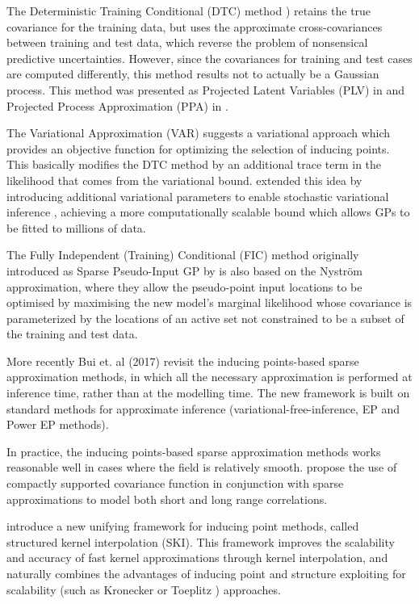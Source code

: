 \documentclass[]{interact}
\theoremstyle{plain}%
\theoremstyle{definition}
\theoremstyle{remark}
\begin{document}
The Deterministic Training Conditional (DTC) method \citep{ro2001sparse,seeger2003fast}) retains the true covariance for the training data, but uses the approximate cross-covariances between training and test data, which reverse the problem of nonsensical predictive uncertainties. However, since the covariances for training and test cases are computed differently, this method results not to actually be a Gaussian process. This method was presented as Projected Latent Variables (PLV) in \cite{seeger2003fast} and Projected Process Approximation (PPA) in \cite{rasmussen2006gaussian}. 

The Variational Approximation (VAR) \citep{titsias2009variational} suggests a variational approach which provides an objective function for optimizing the selection of inducing points. This basically modifies the DTC method by an additional trace term in the likelihood that comes from the variational bound.  \cite{hensman2013gaussian} extended this idea by introducing additional variational parameters to enable stochastic variational inference \citep{hoffman2013stochastic}, achieving a more computationally scalable bound which allows GPs to be fitted to millions of data.

The Fully Independent (Training) Conditional (FIC) \citep{quinonero2005unifying} method originally introduced as Sparse Pseudo-Input GP by \cite{snelson2006sparse} is also based on the Nystr\"om approximation, where they allow the pseudo-point input locations to be optimised by maximising the new model's marginal likelihood whose covariance is parameterized by the locations of an active set not constrained to be a subset of the training and test data.

More recently Bui et. al (2017) revisit the inducing points-based sparse approximation methods, in which all the necessary approximation is performed at inference time, rather than at the modelling time. The new framework is built on standard methods for approximate inference (variational-free-inference, EP and Power EP methods). 

In practice, the inducing points-based sparse approximation methods works reasonable well in cases where the field is relatively smooth. \cite{vanhatalo2010approximate}
propose the use of compactly supported covariance function in conjunction with sparse approximations to model both short and long range correlations.

\cite{wilson2015kernel} introduce a new unifying framework for inducing point methods, called structured kernel interpolation (SKI). This framework improves the scalability and accuracy of fast kernel approximations through kernel interpolation, and naturally combines the advantages of inducing point and structure exploiting for scalability (such as Kronecker \citep{saatcci2012scalable} or Toeplitz \citep{cunningham2008fast}) approaches.
\end{document}
